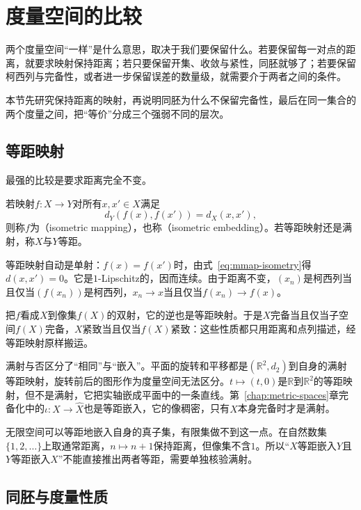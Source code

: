 \section{度量空间的比较}
\label{sec:mmap-comparison}

两个度量空间“一样”是什么意思，取决于我们要保留什么。若要保留每一对点的距离，就要求映射保持距离；若只要保留开集、收敛与紧性，同胚就够了；若要保留柯西列与完备性，或者进一步保留误差的数量级，就需要介于两者之间的条件。

本节先研究保持距离的映射，再说明同胚为什么不保留完备性，最后在同一集合的两个度量之间，把“等价”分成三个强弱不同的层次。

\subsection{等距映射}
\label{sec:mmap-isometry}

最强的比较是要求距离完全不变。

\begin{definition}[等距映射]
\label{def:mmap-isometry}
若映射$f:X\to Y$对所有$x,x'\in X$满足
\begin{equation}
 d_Y(f(x),f(x'))=d_X(x,x'),
 \label{eq:mmap-isometry}
\end{equation}
则称$f$为（isometric mapping），也称（isometric embedding）。若等距映射还是满射，称$X$与$Y$等距。
\end{definition}

等距映射自动是单射：$f(x)=f(x')$时，由式~\eqref{eq:mmap-isometry}得$d(x,x')=0$。它是$1$-Lipschitz的，因而连续。由于距离不变，$(x_n)$是柯西列当且仅当$(f(x_n))$是柯西列，$x_n\to x$当且仅当$f(x_n)\to f(x)$。

把$f$看成$X$到像集$f(X)$的双射，它的逆也是等距映射。于是$X$完备当且仅当子空间$f(X)$完备，$X$紧致当且仅当$f(X)$紧致：这些性质都只用距离和点列描述，经等距映射原样搬运。

满射与否区分了“相同”与“嵌入”。平面的旋转和平移都是$(\mathbb R^2,d_2)$到自身的满射等距映射，旋转前后的图形作为度量空间无法区分。$t\mapsto(t,0)$是$\mathbb R$到$\mathbb R^2$的等距映射，但不是满射，它把实轴嵌成平面中的一条直线。第~\ref{chap:metric-spaces}章完备化中的$\iota:X\to\hat X$也是等距嵌入，它的像稠密，只有$X$本身完备时才是满射。

无限空间可以等距地嵌入自身的真子集，有限集做不到这一点。在自然数集$\{1,2,\ldots\}$上取通常距离，$n\mapsto n+1$保持距离，但像集不含$1$。所以“$X$等距嵌入$Y$且$Y$等距嵌入$X$”不能直接推出两者等距，需要单独核验满射。

\subsection{同胚与度量性质}
\label{sec:mmap-homeomorphism-metric}


